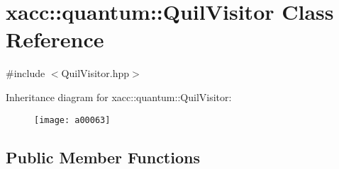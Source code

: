 \hypertarget{a00063}{}\section{xacc\+:\+:quantum\+:\+:Quil\+Visitor Class Reference}
\label{a00063}


{\ttfamily \#include $<$Quil\+Visitor.\+hpp$>$}

Inheritance diagram for xacc\+:\+:quantum\+:\+:Quil\+Visitor\+:\begin{figure}[H]
\begin{center}
\leavevmode
\texttt{[image: a00063]}
\end{center}
\end{figure}
\subsection*{Public Member Functions}
